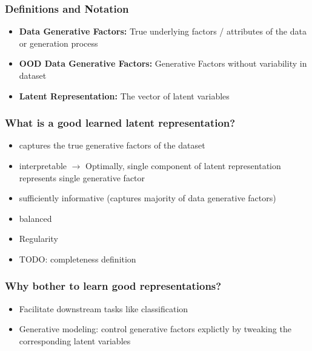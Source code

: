 \documentclass{beamer}
\theoremstyle{definition}
\begin{document}
      \begin{frame}
        \frametitle{Definitions and Notation}
        \begin{itemize}
          \item \textbf{Data Generative Factors:} True underlying factors / attributes of the data or generation process
          \item \textbf{OOD Data Generative Factors:} Generative Factors without variability in dataset
          \item \textbf{Latent Representation:} The vector of latent variables
        \end{itemize}
      \end{frame}

    \begin{frame}
      \frametitle{What is a good learned latent representation?}
      \begin{itemize}
        \item captures the true generative factors of the dataset
        \item interpretable
              $\rightarrow$ Optimally, single component of latent representation represents single generative factor
        \item sufficiently informative (captures majority of data generative factors)
        \item balanced
        \item Regularity
        \item TODO: completeness definition
      \end{itemize}
    \end{frame}

    \begin{frame}
        \frametitle{Why bother to learn good representations?}
        \begin{itemize}
          \item Facilitate downstream tasks like classification
          \item Generative modeling: control generative factors explictly by tweaking the corresponding latent variables
        \end{itemize}
      \end{frame}
\end{document}
